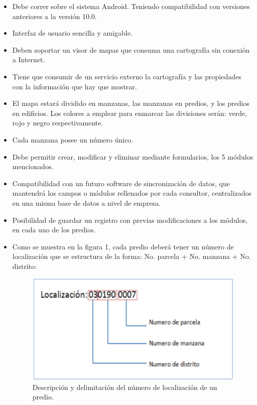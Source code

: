 \begin{itemize}
      \item Debe correr sobre el sistema Android. Teniendo compatibilidad con versiones
            anteriores a la versión 10.0.
      \item Interfaz de usuario sencilla y amigable.
      \item Deben soportar un visor de mapas que consuma una cartografía sin conexión
            a Internet.
      \item Tiene que consumir de un servicio externo la cartografía y las propiedades
            con la información que hay que mostrar.
      \item El mapa estará dividido en manzanas, las manzanas en predios, y los predios
            en edificios. Los colores a emplear para enmarcar las divisiones serán: verde,
            rojo y negro respectivamente.
      \item Cada manzana posee un número único.
      \item Debe permitir crear, modificar y eliminar mediante formularios, los 5 módulos
            mencionados.
      \item Compatibilidad con un futuro software de sincronización de datos, que
            mantendrá los campos o módulos rellenados por cada consultor,
            centralizados en una misma base de datos a nivel de empresa.
      \item Posibilidad de guardar un registro con previas modificaciones a los módulos,
            en cada uno de los predios.
      \item Como se muestra en la figura 1, cada predio deberá tener un número de
            localización que se estructura de la forma: No. parcela + No. manzana + No.
            distrito:
            \begin{figure}[h]
                  \centering
                  \includegraphics[scale=0.5]{Graphics/localizacion_predio.png}
                  \caption{Descripción y delimitación del número de localización de un predio.} %
                  \label{fig:figura1}
            \end{figure}
\end{itemize}
